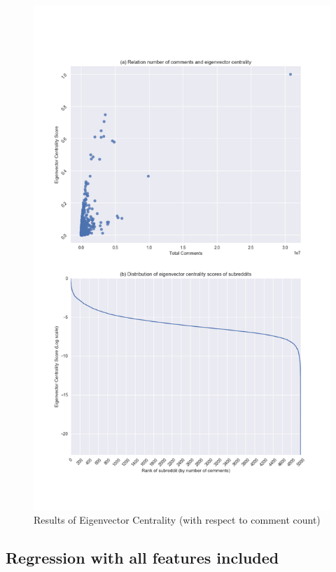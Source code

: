 \documentclass[bsc,frontabs,twoside,singlespacing,parskip,deptreport]{infthesis}
\begin{document}
\begin{figure}[p]
	\centering
  	\includegraphics[width=\textwidth]{eigen_centrality.png}
  	\caption{Results of Eigenvector Centrality (with respect to comment count)}
  	\label{fig:eigen_centrality}
\end{figure}

\newpage
\subsection{Regression with all features included}\label{regression-all}
\end{document}
